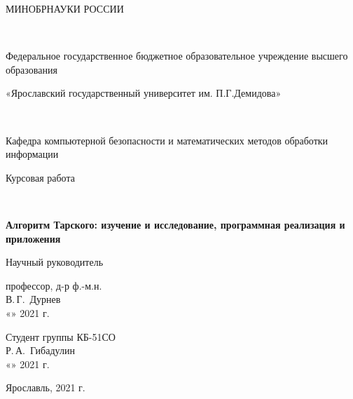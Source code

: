 \begin{titlepage}
    \begin{center}
        {\large МИНОБРНАУКИ РОССИИ
            
            ~
            
            Федеральное государственное бюджетное образовательное учреждение высшего образования
                
            «Ярославский государственный университет им. П.Г.Демидова»
            
            ~
            
            Кафедра компьютерной безопасности и
            математических методов обработки информации}
        \vfill
        
        {\large Курсовая работа}
        
        ~
        
        \textbf{{\large Алгоритм Тарского: изучение и исследование, программная реализация и приложения}}
    \end{center}
    \vfill
    
    \newlength{\ML}
    \hfill\begin{minipage}{0.4\textwidth}
        Научный руководитель
        
        профессор, д-р ф.-м.н.
        \\
        \underline{\hspace{\ML}} В.\,Г.~Дурнев\\
        «\underline{\hspace{0.7cm}}» \underline{\hspace{2cm}} 2021 г.
    \end{minipage}%
    \bigskip
    
    \hfill\begin{minipage}{0.4\textwidth}
        Студент группы КБ-51СО
        \\
        \underline{\hspace{\ML}} Р.\,А.~Гибадулин\\
        «\underline{\hspace{0.7cm}}» \underline{\hspace{2cm}} 2021 г.
    \end{minipage}%
    \vfill
    
    \begin{center}
        Ярославль, 2021 г.
    \end{center}
\end{titlepage}